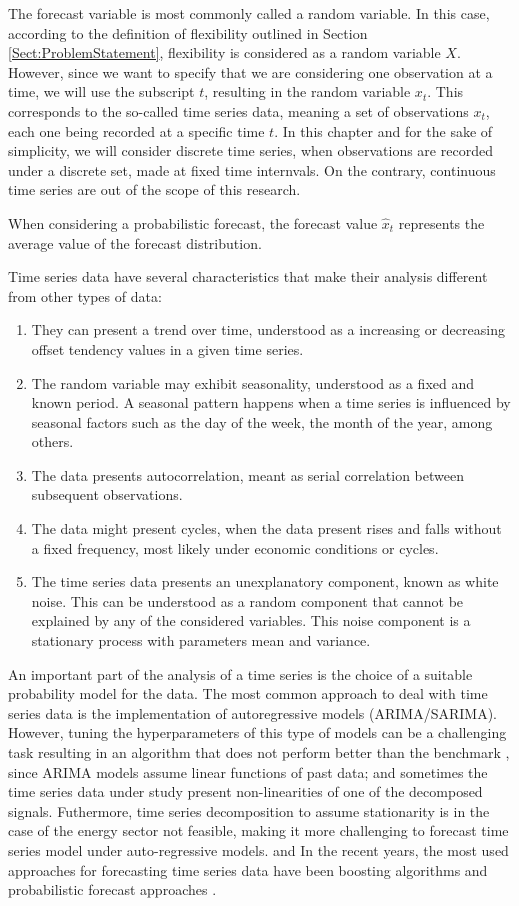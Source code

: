 The forecast variable is most commonly called a random variable. In this case, according to the definition of flexibility outlined in Section \ref{Sect:ProblemStatement}, flexibility is considered as a random variable $X$. However, since we want to specify that we are considering one observation at a time, we will use the subscript $t$, resulting in the random variable $x_t$. This corresponds to the so-called time series data, meaning a set of observations $x_t$, each one being recorded at a specific time $t$. In this chapter and for the sake of simplicity, we will consider discrete time series, when observations are recorded under a discrete set, made at fixed time internvals. On the contrary, continuous time series are out of the scope of this research. 

When considering a probabilistic forecast, the forecast value $\hat{x}_t$ represents the average value of the forecast distribution.

Time series data have several characteristics that make their analysis different from other types of data: 
\begin{enumerate}
\item They can present a trend over time, understood as a increasing or decreasing offset tendency values in a given time series. 
\item The random variable may exhibit seasonality, understood as a fixed and known period. A seasonal pattern happens when a time series is influenced by seasonal factors such as the day of the week, the month of the year, among others. 
\item The data presents autocorrelation, meant as serial correlation between subsequent observations. 
\item The data might present cycles, when the data present rises and falls without a fixed frequency, most likely under economic conditions or cycles. 
\item The time series data presents an unexplanatory component, known as white noise. This can be understood as a random component that cannot be explained by any of the considered variables. This noise component is a stationary process with parameters mean and variance. 
\end{enumerate} 

An important part of the analysis of a time series is the choice of a suitable probability model for the data. The most common approach to deal with time series data is the implementation of autoregressive models (ARIMA/SARIMA). However, tuning the hyperparameters of this type of models can be a challenging task resulting in an algorithm that does not perform better than the benchmark \cite{nonlinearARIMA}, since ARIMA models assume linear functions of past data; and sometimes the time series data under study present non-linearities of one of the decomposed signals. Futhermore, time series decomposition to assume stationarity is in the case of the energy sector not feasible, making it more challenging to forecast time series model under auto-regressive models. and In the recent years, the most used approaches for forecasting time series data have been boosting algorithms and probabilistic forecast approaches \cite{Robinzonov2010, Barrow2016, Taieb2017, Guen2020}.  

